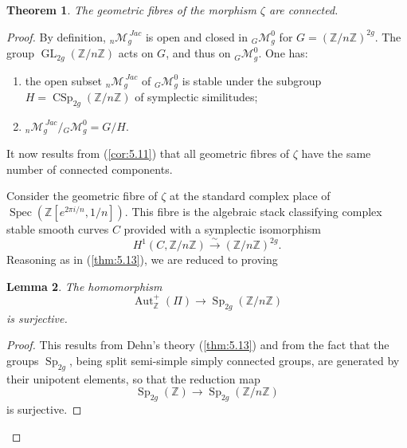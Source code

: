 \documentclass[10pt]{amsart}
\theoremstyle{plain}
\newtheorem{theorem}{Theorem}[section]
\newtheorem{lemma}[theorem]{Lemma}
\theoremstyle{definition}
\DeclareMathOperator{\Aut}{Aut}
\DeclareMathOperator{\Spec}{Spec}
\DeclareMathOperator{\Sp}{Sp}
\DeclareMathOperator{\CSp}{CSp}
\DeclareMathOperator{\GL}{GL}
\begin{document}
\begin{theorem}\label{thm:5.15}
The geometric fibres of the morphism $\zeta$ are connected.
\end{theorem}

\begin{proof}
By definition, $_n\mathscr{M}_g^{\ Jac}$ is open and closed in $_G\mathscr{M}_g^0$ for $G = (\mathbb{Z}/n\mathbb{Z})^{2g}$. The group $\GL_{2g}(\mathbb{Z}/n\mathbb{Z})$ acts on $G$, and thus on $_G\mathscr{M}_g^0$. One has:
\begin{enumerate}
\item[(i)] the open subset $_n\mathscr{M}_g^{\ Jac}$ of $_G\mathscr{M}_g^0$ is stable under the subgroup $H = \CSp_{2g}(\mathbb{Z}/n\mathbb{Z})$ of symplectic similitudes;
\item[(ii)] $_n\mathscr{M}_g^{\ Jac} / {_G\mathscr{M}_g^0} = G/H$.
\end{enumerate}

It now results from (\ref{cor:5.11}) that all geometric fibres of $\zeta$ have the same number of connected components.

Consider the geometric fibre of $\zeta$ at the standard complex place of $\Spec(\mathbb{Z}[e^{2\pi i/n}, 1/n])$. This fibre is the algebraic stack classifying complex stable smooth curves $C$ provided with a symplectic isomorphism
\[
H^1(C, \mathbb{Z}/n\mathbb{Z}) \xrightarrow{\sim} (\mathbb{Z}/n\mathbb{Z})^{2g}.
\]
Reasoning as in (\ref{thm:5.13}), we are reduced to proving

\begin{lemma}\label{lem:5.16}
The homomorphism
\[
\Aut_{\mathbb{Z}}^+(\Pi) \longrightarrow \Sp_{2g}(\mathbb{Z}/n\mathbb{Z})
\]
is surjective.
\end{lemma}

\begin{proof}
This results from Dehn's theory (\ref{thm:5.13}) and from the fact that the groups $\Sp_{2g}$, being split semi-simple simply connected groups, are generated by their unipotent elements, so that the reduction map
\[
\Sp_{2g}(\mathbb{Z}) \longrightarrow \Sp_{2g}(\mathbb{Z}/n\mathbb{Z})
\]
is surjective.
\end{proof}
\end{proof}
\end{document}
